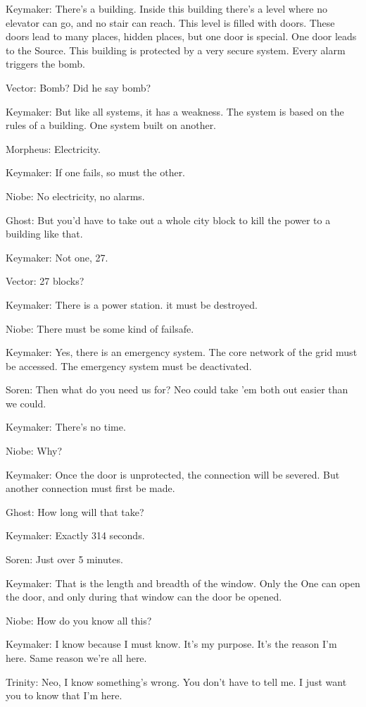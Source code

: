 \documentclass[UTF8]{ctexart}
\newenvironment{myquote}{\color{green} \setlength{\leftskip}{6em} \setlength{\rightskip}{4em} \setlength{\parindent}{-2em}}{\par}
\begin{document}
\begin{myquote}
Keymaker: There's a building. Inside this building there's a level where no elevator can go, and no stair can reach. This level is filled with doors. These doors lead to many places, hidden places, but one door is special. One door leads to the Source. This building is protected by a very secure system. Every alarm triggers the bomb.

Vector: Bomb? Did he say bomb?

Keymaker: But like all systems, it has a weakness. The system is based on the rules of a building. One system built on another.

Morpheus: Electricity.

Keymaker: If one fails, so must the other.

Niobe: No electricity, no alarms.

Ghost: But you'd have to take out a whole city block to kill the power to a building like that.

Keymaker: Not one, 27.

Vector: 27 blocks?

Keymaker: There is a power station. it must be destroyed.

Niobe: There must be some kind of failsafe.

Keymaker: Yes, there is an emergency system. The core network of the grid must be accessed. The emergency system must be deactivated.

Soren: Then what do you need us for? Neo could take 'em both out easier than we could.

Keymaker: There's no time.

Niobe: Why?

Keymaker: Once the door is unprotected, the connection will be severed. But another connection must first be made.

Ghost: How long will that take?

Keymaker: Exactly 314 seconds.

Soren: Just over 5 minutes.

Keymaker: That is the length and breadth of the window. Only the One can open the door, and only during that window can the door be opened.

Niobe: How do you know all this?

Keymaker: I know because I must know. It's my purpose. It's the reason I'm here. Same reason we're all here.

Trinity: Neo, I know something's wrong. You don't have to tell me. I just want you to know that I'm here.


\end{myquote}
\end{document}
